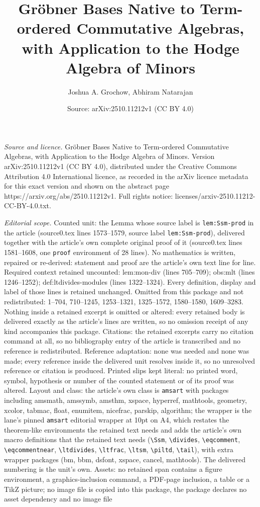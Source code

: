 \documentclass[10pt,a4paper]{amsart}
\title[Gr\"obner Bases Native to Term-ordered Commutative Algebras,]{Gr\"obner Bases Native to Term-ordered Commutative Algebras, with Application to the Hodge Algebra of Minors}
\author{Joshua A. Grochow, Abhiram Natarajan}
\date{Source: arXiv:2510.11212v1 (CC BY 4.0)}
\begin{document}
\maketitle

\noindent\emph{Source and licence.} Gr\"obner Bases Native to Term-ordered Commutative Algebras, with Application to the Hodge Algebra of Minors. Version arXiv:2510.11212v1 (CC BY 4.0), distributed under the Creative Commons Attribution 4.0 International licence, as recorded in the arXiv licence metadata for this exact version and shown on the abstract page https://arxiv.org/abs/2510.11212v1. Full rights notice: licenses/arxiv-2510.11212-CC-BY-4.0.txt.\par\smallskip

\noindent\textit{Editorial scope.} Counted unit: the Lemma whose source label is \texttt{lem:Ssm-prod} in the article (source0.tex lines 1573--1579, source label \texttt{lem:Ssm-prod}), delivered together with the article's own complete original proof of it (source0.tex lines 1581--1608, one \texttt{proof} environment of 28 lines). No mathematics is written, repaired or re-derived: statement and proof are the article's own text line for line. Required context retained uncounted: lem:mon-div (lines 705--709); obs:mlt (lines 1246--1252); def:ltdivides-modules (lines 1322--1324). Every definition, display and label of those lines is retained unchanged. Omitted from this package and not redistributed: 1--704, 710--1245, 1253--1321, 1325--1572, 1580--1580, 1609--3283. Nothing inside a retained excerpt is omitted or altered: every retained body is delivered exactly as the article's lines are written, so no omission receipt of any kind accompanies this package. Citations: the retained excerpts carry no citation command at all, so no bibliography entry of the article is transcribed and no reference is redistributed. Reference adaptation: none was needed and none was made; every reference inside the delivered unit resolves inside it, so no unresolved reference or citation is produced. Printed slips kept literal: no printed word, symbol, hypothesis or number of the counted statement or of its proof was altered. Layout and class: the article's own class is \texttt{amsart} with packages including amsmath, amssymb, amsthm, xspace, hyperref, mathtools, geometry, xcolor, tabmac, float, enumitem, nicefrac, parskip, algorithm; the wrapper is the lane's pinned \texttt{amsart} editorial wrapper at 10pt on A4, which restates the theorem-like environments the retained text needs and adds the article's own macro definitions that the retained text needs (\texttt{\textbackslash Ssm}, \texttt{\textbackslash divides}, \texttt{\textbackslash eqcomment}, \texttt{\textbackslash eqcommentnear}, \texttt{\textbackslash ltdivides}, \texttt{\textbackslash ltfrac}, \texttt{\textbackslash ltsm}, \texttt{\textbackslash piltd}, \texttt{\textbackslash tail}), with extra wrapper packages (bm, bbm, dsfont, xspace, cancel, mathtools). The delivered numbering is the unit's own. Assets: no retained span contains a figure environment, a graphics-inclusion command, a PDF-page inclusion, a table or a TikZ picture; no image file is copied into this package, the package declares no asset dependency and no image file 
\end{document}
